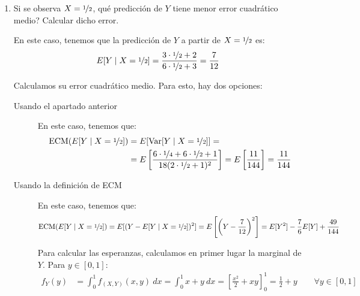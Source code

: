 \begin{ejercicio}
\begin{enumerate}
        \item Si se observa $X = \nicefrac{1}{2}$, qué predicción de $Y$ tiene menor error cuadrático medio? Calcular dicho error.
        
        En este caso, tenemos que la predicción de $Y$ a partir de $X = \nicefrac{1}{2}$ es:
        \begin{equation*}
            E[Y\mid X = \nicefrac{1}{2}] = \dfrac{3\cdot \nicefrac{1}{2}+2}{6\cdot \nicefrac{1}{2}+3} = \dfrac{7}{12}
        \end{equation*}

        Calculamos su error cuadrático medio. Para esto, hay dos opciones:
        \begin{description}
            \item[Usando el apartado anterior] En este caso, tenemos que:
            \begin{align*}
                \text{ECM}(E[Y\mid X = \nicefrac{1}{2}]) &= E[\operatorname{Var}[Y\mid X = \nicefrac{1}{2}]]
                =\\&= E\left[\dfrac{6\cdot \nicefrac{1}{4}+6\cdot \nicefrac{1}{2}+1}{18(2\cdot \nicefrac{1}{2}+1)^2}\right] = E\left[\dfrac{11}{144}\right]
                = \dfrac{11}{144}
            \end{align*}

            \item[Usando la definición de ECM] En este caso, tenemos que:
            \begin{equation*}
                \text{ECM}(E[Y\mid X = \nicefrac{1}{2}]) = E[(Y-E[Y\mid X = \nicefrac{1}{2}])^2]
                = E\left[\left(Y-\dfrac{7}{12}\right)^2\right]
                = E[Y^2]-\dfrac{7}{6}E[Y]+\dfrac{49}{144}
            \end{equation*}

            Para calcular las esperanzas, calculamos en primer lugar la marginal de $Y$. Para $y\in [0,1]$:
            \begin{align*}
                f_Y(y) &= \int_{0}^{1} f_{(X,Y)}(x, y) \ dx
                = \int_{0}^{1} x+y \ dx
                = \left[\frac{x^2}{2}+xy\right]_{0}^{1}
                = \frac{1}{2}+y \qquad \forall y\in[0,1]
            \end{align*}


\end{description}
\end{enumerate}
\end{ejercicio}
